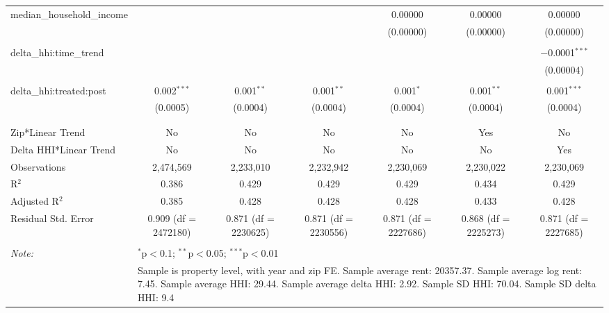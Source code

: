 \begin{table}[H]
{\begin{tabular}{@{\extracolsep{5pt}}lcccccc}
  median\_household\_income &  &  &  & 0.00000 & 0.00000 & 0.00000 \\  

   &  &  &  & (0.00000) & (0.00000) & (0.00000) \\  

   & & & & & & \\  

  delta\_hhi:time\_trend &  &  &  &  &  & $-$0.0001$^{***}$ \\  

   &  &  &  &  &  & (0.00004) \\  

   & & & & & & \\  

  delta\_hhi:treated:post & 0.002$^{***}$ & 0.001$^{**}$ & 0.001$^{**}$ & 0.001$^{*}$ & 0.001$^{**}$ & 0.001$^{***}$ \\  

   & (0.0005) & (0.0004) & (0.0004) & (0.0004) & (0.0004) & (0.0004) \\  

   & & & & & & \\  

 \hline \\[-1.8ex]  

 Zip*Linear Trend & No & No & No & No & Yes & No \\  

 Delta HHI*Linear Trend & No & No & No & No & No & Yes \\  

 Observations & 2,474,569 & 2,233,010 & 2,232,942 & 2,230,069 & 2,230,022 & 2,230,069 \\  

 R$^{2}$ & 0.386 & 0.429 & 0.429 & 0.429 & 0.434 & 0.429 \\  

 Adjusted R$^{2}$ & 0.385 & 0.428 & 0.428 & 0.428 & 0.433 & 0.428 \\  

 Residual Std. Error & 0.909 (df = 2472180) & 0.871 (df = 2230625) & 0.871 (df = 2230556) & 0.871 (df = 2227686) & 0.868 (df = 2225273) & 0.871 (df = 2227685) \\  

 \hline  

 \hline \\[-1.8ex]  

 \textit{Note:}  & \multicolumn{6}{l}{$^{*}$p$<$0.1; $^{**}$p$<$0.05; $^{***}$p$<$0.01} \\  

  & \multicolumn{6}{l}{Sample is property level, with year and zip FE. Sample average rent: 20357.37. Sample average log rent: 7.45. Sample average HHI: 29.44. Sample average delta HHI: 2.92. Sample SD HHI: 70.04. Sample SD delta HHI: 9.4} \\  

 \end{tabular}}  

 \end{table}  

